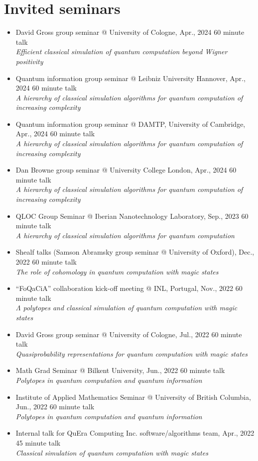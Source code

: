 \documentclass[letterpaper,11pt]{article}
\newcommand{\ConferenceItem}[3]{
	\item{\parbox{0.97\textwidth}{
		{#1}  \hfill {#2}\\
		\emph{#3}
	}}
}
\begin{document}
\section*{Invited seminars}
\begin{itemize}[leftmargin=*]
	\ConferenceItem{David Gross group seminar @ University of Cologne, Apr., 2024}{60 minute talk}{Efficient classical simulation of quantum computation beyond Wigner positivity}
	
	\ConferenceItem{Quantum information group seminar @ Leibniz University Hannover, Apr., 2024}{60 minute talk}{A hierarchy of classical simulation algorithms for quantum computation of increasing complexity}
	
	\ConferenceItem{Quantum information group seminar @ DAMTP, University of Cambridge, Apr., 2024}{60 minute talk}{A hierarchy of classical simulation algorithms for quantum computation of increasing complexity}
	
	\ConferenceItem{Dan Browne group seminar @ University College London, Apr., 2024}{60 minute talk}{A hierarchy of classical simulation algorithms for quantum computation of increasing complexity}
	
	\ConferenceItem{QLOC Group Seminar @ Iberian Nanotechnology Laboratory, Sep., 2023}{60 minute talk}{A hierarchy of classical simulation algorithms for quantum computation}
	
	\ConferenceItem{Shealf talks (Samson Abramsky group seminar @ University of Oxford), Dec., 2022}{60 minute talk}{The role of cohomology in quantum computation with magic states}
	
	\ConferenceItem{``FoQaCiA'' collaboration kick-off meeting @ INL, Portugal, Nov., 2022}{60 minute talk}{$\Lambda$ polytopes and classical simulation of quantum computation with magic states}
	
	\ConferenceItem{David Gross group seminar @ University of Cologne, Jul., 2022}{60 minute talk}{Quasiprobability representations for quantum computation with magic states}
	
	\ConferenceItem{Math Grad Seminar @ Bilkent University, Jun., 2022}{60 minute talk}{Polytopes in quantum computation and quantum information}
	
	\ConferenceItem{Institute of Applied Mathematics Seminar @ University of British Columbia, Jun., 2022}{60 minute talk}{Polytopes in quantum computation and quantum information}
	
	\ConferenceItem{Internal talk for QuEra Computing Inc. software/algorithms team, Apr., 2022}{45 minute talk}{Classical simulation of quantum computation with magic states}
\end{itemize}
\end{document}
